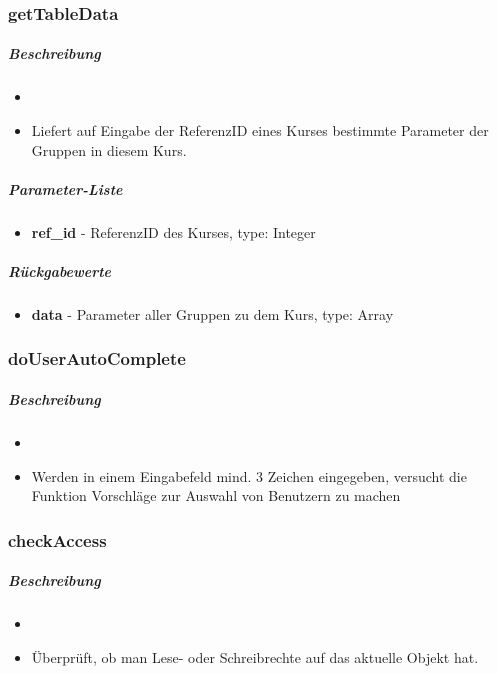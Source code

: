 \subsubsection*{getTableData}\label{getTableDataGDGUI}
\subparagraph{Beschreibung}
\begin{itemize}
	\item[] \noindent{}
	\item[] Liefert auf Eingabe der ReferenzID eines Kurses bestimmte Parameter der Gruppen in diesem Kurs.
\end{itemize}
\subparagraph{Parameter-Liste}
\begin{itemize}
	\item[] \textbf{ref\_id} - ReferenzID des Kurses, type: Integer
\end{itemize}
\subparagraph{Rückgabewerte}
\begin{itemize}
	\item[] \textbf{data} - Parameter aller Gruppen zu dem Kurs, type: Array
\end{itemize}

\subsubsection*{doUserAutoComplete}\label{doUserAutoCompleteGDGUI}
\subparagraph{Beschreibung}
\begin{itemize}
	\item[] \noindent{}
	\item[] Werden in einem Eingabefeld mind. 3 Zeichen eingegeben, versucht die Funktion Vorschläge zur Auswahl von Benutzern zu machen
\end{itemize}

\subsubsection*{checkAccess}\label{checkAccessGDGUI}
\subparagraph{Beschreibung}
\begin{itemize}
	\item[] \noindent{}
	\item[] Überprüft, ob man Lese- oder Schreibrechte auf das aktuelle Objekt hat.
\end{itemize}